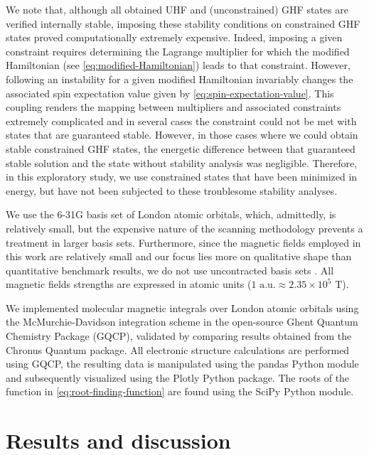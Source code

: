 \documentclass[journal=jctc,manuscript=article]{achemso}
\begin{document}
    We note that, although all obtained UHF and (unconstrained) GHF states are verified internally stable, imposing these stability conditions on constrained GHF states proved computationally extremely expensive. Indeed, imposing a given constraint requires determining the Lagrange multiplier for which the modified Hamiltonian (see \cref{eq:modified-Hamiltonian}) leads to that constraint. However, following an instability for a given modified Hamiltonian invariably changes the associated spin expectation value given by \cref{eq:spin-expectation-value}. This coupling renders the mapping between multipliers and associated constraints extremely complicated and in several cases the constraint could not be met with states that are guaranteed stable. However, in those cases where we could obtain stable constrained GHF states, the energetic difference between that guaranteed stable solution and the state without stability analysis was negligible. Therefore, in this exploratory study, we use constrained states that have been minimized in energy, but have not been subjected to these troublesome stability analyses.

    We use the 6-31G basis set of London atomic orbitals, which, admittedly, is relatively small, but the expensive nature of the scanning methodology prevents a treatment in larger basis sets.
    Furthermore, since the magnetic fields employed in this work are relatively small and our focus lies more on qualitative shape than quantitative benchmark results, we do not use uncontracted basis sets \cite{Lange.2012, Stopkowicz.2018}. All magnetic fields strengths are expressed in atomic units ($1\text{ a.u.} \approx 2.35\times10^5 \text{ T}$).

    We implemented molecular magnetic integrals over London atomic orbitals using the McMurchie-Davidson integration scheme in the open-source Ghent Quantum Chemistry Package (GQCP),\cite{GQCP, repository, Lemmens.2021} validated by comparing results obtained from the Chronus Quantum\cite{Williams-Young.2020} package.
    All electronic structure calculations are performed using GQCP, the resulting data is manipulated using the pandas\cite{McKinney.2010} Python module and subsequently visualized using the Plotly\cite{Plotly} Python package.
    The roots of the function in \cref{eq:root-finding-function} are found using the SciPy\cite{Virtanen.2020} Python module.


\section{Results and discussion}
\end{document}
